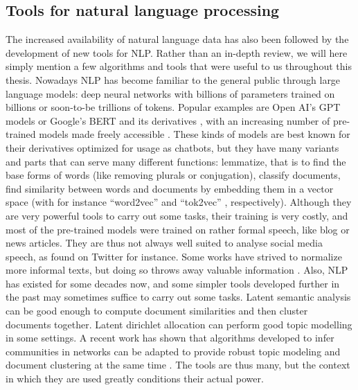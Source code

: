 \documentclass[../thesis.tex]{subfiles}
\begin{document}
\subsection{Tools for natural language processing}
The increased availability of natural language data has also been followed by the
development of new tools for \ac{NLP}. Rather than an in-depth review, we will here
simply mention a few algorithms and tools that were useful to us throughout this thesis.
Nowadays \ac{NLP} has become familiar to the general public through large language
models: deep neural networks with billions of parameters trained on billions or
soon-to-be trillions of tokens. Popular examples are Open AI's GPT models
\cite{BrownLanguageModels2020} or Google's BERT \cite{DevlinBERTPretraining2019} and its
derivatives \cite{SanhDistilBERTDistilled2020}, with an increasing number of pre-trained
models made freely accessible
\cite{WolfTransformersStateoftheArt2020,MontaniExplosionSpaCy2023}. These kinds of
models are best known for their derivatives optimized for usage as chatbots, but they
have many variants and parts that can serve many different functions: lemmatize, that is
to find the base forms of words (like removing plurals or conjugation), classify
documents, find similarity between words and documents by embedding them in a vector
space (with for instance ``word2vec'' \cite{MikolovEfficientEstimation2013} and
``tok2vec'' \cite{AngelovTop2VecDistributed2020}, respectively). Although they are very
powerful tools to carry out some tasks, their training is very costly, and most of the
pre-trained models were trained on rather formal speech, like blog or news articles.
They are thus not always well suited to analyse social media speech, as found on Twitter
for instance. Some works have strived to normalize more informal texts, but doing so
throws away valuable information \cite{EisensteinWhatBad2013}. Also, \ac{NLP} has
existed for some decades now, and some simpler tools developed further in the past may
sometimes suffice to carry out some tasks. Latent semantic analysis
\cite{DumaisLatentSemantic2004} can be good enough to compute document similarities and
then cluster documents together. Latent dirichlet allocation
\cite{BleiLatentDirichlet2003} can perform good topic modelling in some settings. A
recent work has shown that algorithms developed to infer communities in networks can be
adapted to provide robust topic modeling and document clustering at the same time
\cite{GerlachNetworkApproach2018}. The tools are thus many, but the context in which
they are used greatly conditions their actual power.
\end{document}
